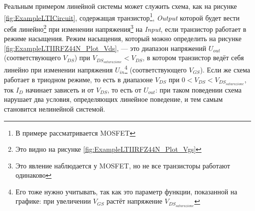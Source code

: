 \documentclass[a4paper, 10pt, final]{article} %
\begin{document}
    Реальным примером линейной системы может служить схема, как на рисунке \ref{fig:ExampleLTICircuit}, содержащая транзистор\footnote{В примере рассматривается MOSFET}, \emph{Output} которой будет вести себя линейно\footnote{Это видно на рисунке \ref{fig:ExampleLTIIRFZ44N_Plot_Vgs}} при изменении напряжения\footnote{Это явление наблюдается у MOSFET, но не все транзисторы работают одинаково} на \emph{Input}, если транзистор работает в режиме насыщения.
    Режим насыщения, который можно определить на рисунке \ref{fig:ExampleLTIIRFZ44N_Plot_Vds}, --- это диапазон напряжений $U_{out}$ (соответствующего $V_{DS}$) при $V_{DS_{saturazione}} < V_{DS}$, в котором транзистор ведёт себя линейно при изменении напряжения $U_{in}$\footnote{Его тоже нужно учитывать, так как это параметр функции, показанной на графике: при увеличении $V_{GS}$ растёт напряжение $V_{DS_{saturazione}}$} (соответствующего $V_{GS}$).
    Если же схема работает в триодном режиме, то есть в диапазоне $V_{DS}$ при $0 < V_{DS} < V_{DS_{saturazione}}$, ток $I_D$ начинает зависеть и от $V_{DS}$, то есть от $U_{out}$: при таком поведении схема нарушает два условия, определяющих линейное поведение, и тем самым становится нелинейной системой.
\end{document}
